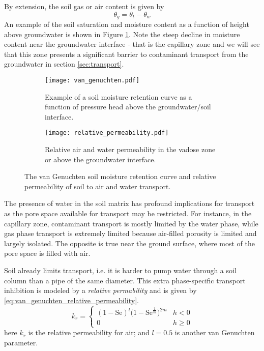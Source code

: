 By extension, the soil gas or air content is given by
\begin{equation}\label{eq:gas_porosity}
  \theta_g = \theta_t - \theta_w
\end{equation}
An example of the soil saturation and moisture content as a function of height above groundwater is shown in Figure \ref{fig:retention_curve}.
Note the steep decline in moisture content near the groundwater interface - that is the capillary zone and we will see that this zone presents a significant barrier to contaminant transport from the groundwater in section \ref{sec:transport}.\par

\begin{figure}[htb!]
  \centering
  \begin{subfigure}{\textwidth}
    \centering
    \texttt{[image: van\_genuchten.pdf]}
    \caption{Example of a soil moisture retention curve as a function of pressure head above the groundwater/soil interface.}
    \label{fig:retention_curve}
  \end{subfigure}
  \begin{subfigure}{\textwidth}
    \centering
    \texttt{[image: relative\_permeability.pdf]}
    \caption{Relative air and water permeability in the vadose zone or above the groundwater interface.}
    \label{fig:relative_permeability}
  \end{subfigure}
  \caption[van Genuchten soil moisture retention curve and relative permeability]{The van Genuchten soil moisture retention curve and relative permeability of soil to air and water transport.}
\end{figure}

The presence of water in the soil matrix has profound implications for transport as the pore space available for transport may be restricted.
For instance, in the capillary zone, contaminant transport is mostly limited by the water phase, while gas phase transport is extremely limited because air-filled porosity is limited and largely isolated.
The opposite is true near the ground surface, where most of the pore space is filled with air.\par

Soil already limits transport, i.e. it is harder to pump water through a soil column than a pipe of the same diameter.
This extra phase-specific transport inhibition is modeled by a \textit{relative permability} and is given by \eqref{eq:van_genuchten_relative_permeability}.
\begin{equation}\label{eq:van_genuchten_relative_permeability}
  k_r =
    \begin{cases}
      (1-\mathrm{Se})^l \big(1 - \mathrm{Se}^\frac{1}{m} \big)^{2m} & h < 0 \\
      0 & h \geq 0
    \end{cases}
\end{equation}
here $k_r$ is the relative permeability for air;
and $l = 0.5$ is another van Genuchten parameter.\par %

